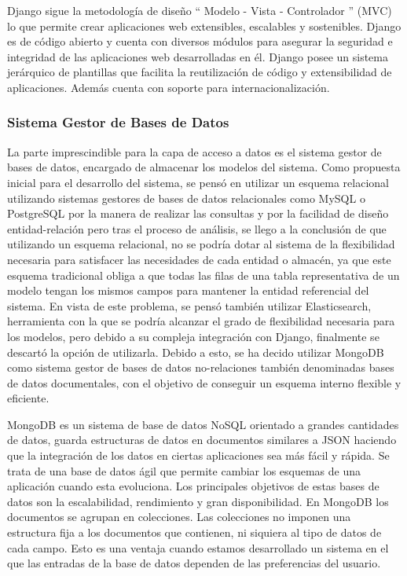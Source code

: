 \documentclass[a4paper,11pt]{book}
\begin{document}
Django sigue la metodología de diseño “ Modelo - Vista - Controlador ” (MVC) lo que permite crear aplicaciones web extensibles, escalables y sostenibles. Django es de código abierto y cuenta con diversos módulos para asegurar la seguridad e integridad de las aplicaciones web desarrolladas en él. 
Django posee un sistema jerárquico de plantillas que facilita la reutilización de código y extensibilidad de aplicaciones. Además cuenta con soporte para internacionalización.
\subsubsection{Sistema Gestor de Bases de Datos}
La parte imprescindible para la capa de acceso a datos es el sistema gestor de bases de datos, encargado de almacenar los modelos del sistema. Como propuesta inicial para el desarrollo del sistema, se pensó en utilizar un esquema relacional utilizando sistemas gestores de bases de datos relacionales como MySQL o PostgreSQL por la manera de realizar las consultas y por la facilidad de diseño entidad-relación pero tras el proceso de análisis, se llego a la conclusión de que utilizando un esquema relacional, no se podría dotar al sistema de la flexibilidad necesaria para satisfacer las necesidades de cada entidad o almacén, ya que este esquema tradicional obliga a que todas las filas de una tabla representativa de un modelo tengan los mismos campos para mantener la entidad referencial del sistema. En vista de este problema, se pensó también utilizar Elasticsearch, herramienta con la que se podría alcanzar el grado de flexibilidad necesaria para los modelos, pero debido a su compleja integración con Django, finalmente se descartó la opción de utilizarla. Debido a esto, se ha decido utilizar MongoDB\cite{mg} como sistema gestor de bases de datos no-relaciones también denominadas bases de datos documentales, con el objetivo de conseguir un esquema interno flexible y eficiente. 

MongoDB es un sistema de base de datos NoSQL orientado a grandes cantidades de datos, guarda estructuras de datos en documentos similares a JSON haciendo que la integración de los datos en ciertas aplicaciones sea más fácil y rápida.
Se trata de una base de datos ágil que permite cambiar los esquemas de una aplicación cuando esta evoluciona. Los principales objetivos de estas bases de datos son la escalabilidad, rendimiento y gran disponibilidad.
En MongoDB los documentos se agrupan en colecciones. Las colecciones  no imponen una estructura fija a los documentos que contienen, ni siquiera al tipo de datos de cada campo. Esto es una ventaja cuando estamos desarrollado un sistema en el que las entradas de la base de datos dependen de las preferencias del usuario.
\end{document}
